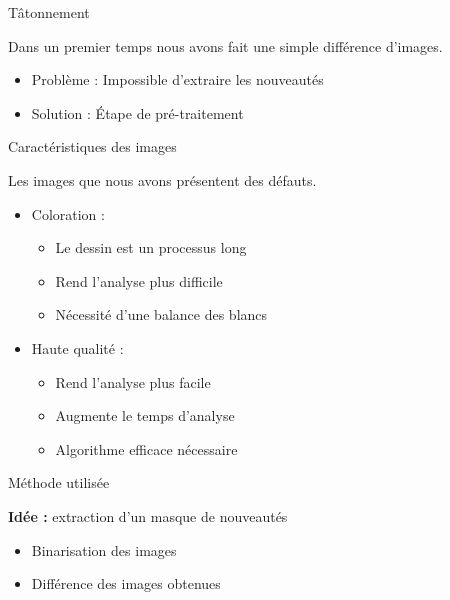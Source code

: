 \documentclass[t,14pt]{beamer}
\begin{document}
\begin{frame}{Tâtonnement}
\vspace{5mm}
\begin{block}{}
Dans un premier temps nous avons fait une simple différence d'images.
\end{block}
\vspace{5mm}
\begin{itemize}
\item Problème : Impossible d'extraire les nouveautés
\item Solution : \'Etape de pré-traitement
\end{itemize}
\end{frame}

\begin{frame}{Caractéristiques des images}
\vspace{5mm}
\begin{block}{}
Les images que nous avons présentent des défauts.
\end{block}

\begin{itemize}
\item Coloration : 
	\begin{itemize}
	\item Le dessin est un processus long
	\item Rend l'analyse plus difficile
	\item Nécessité d'une balance des blancs
	\end{itemize}
\item Haute qualité :
	\begin{itemize}
	\item Rend l'analyse plus facile
	\item Augmente le temps d'analyse
	\item Algorithme efficace nécessaire
	\end{itemize}
\end{itemize}
\end{frame}

\begin{frame}{Méthode utilisée}
\vspace{5mm}
\begin{block}{}
\textbf{Idée :} extraction d'un masque de nouveautés
\end{block}
\begin{itemize}
\item Binarisation des images
\item Différence des images obtenues
\end{itemize}
\end{frame}
\end{document}
